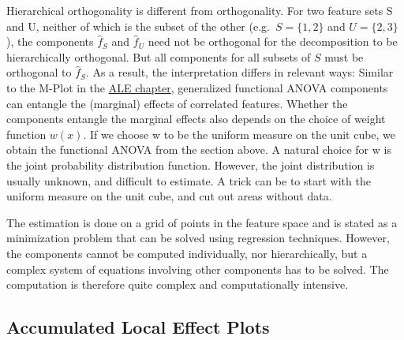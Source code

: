 \documentclass[
  11pt,
]{scrbook}
\begin{document}
Hierarchical orthogonality is different from orthogonality.
For two feature sets S and U, neither of which is the subset of the other (e.g.~\(S=\{1,2\}\) and \(U=\{2,3\}\)), the components \(\hat{f}_S\) and \(\hat{f}_U\) need not be orthogonal for the decomposition to be hierarchically orthogonal.
But all components for all subsets of \(S\) must be orthogonal to \(\hat{f}_S\).
As a result, the interpretation differs in relevant ways:
Similar to the M-Plot in the \protect\hyperlink{ale}{ALE chapter}, generalized functional ANOVA components can entangle the (marginal) effects of correlated features.
Whether the components entangle the marginal effects also depends on the choice of weight function \(w(x)\).
If we choose w to be the uniform measure on the unit cube, we obtain the functional ANOVA from the section above.
A natural choice for w is the joint probability distribution function.
However, the joint distribution is usually unknown, and difficult to estimate.
A trick can be to start with the uniform measure on the unit cube, and cut out areas without data.

The estimation is done on a grid of points in the feature space and is stated as a minimization problem that can be solved using regression techniques.
However, the components cannot be computed individually, nor hierarchically, but a complex system of equations involving other components has to be solved.
The computation is therefore quite complex and computationally intensive.

\hypertarget{accumulated-local-effect-plots}{%
\subsection{Accumulated Local Effect Plots}\label{accumulated-local-effect-plots}}
\end{document}
